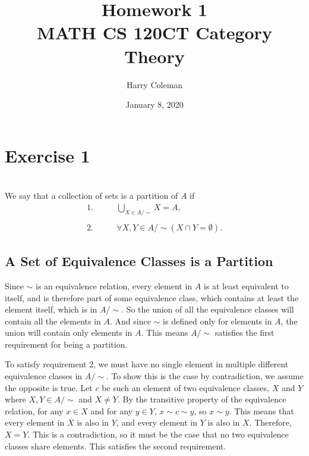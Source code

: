 \documentclass[12pt]{article}
\begin{document}
 
\title{Homework 1\\
    \large MATH CS 120CT Category Theory}
\author{Harry Coleman}
\date{January 8, 2020}

\maketitle

\section*{Exercise 1}
\\

We say that a collection of sets is a partition of $A$ if
\begin{align*}
    1. \qquad & \bigcup_{X\in A/{\sim}}X = A, \\\\
    2. \qquad & \forall X,Y \in A/{\sim} (X \cap Y = \emptyset).
\end{align*}

\subsection*{A Set of Equivalence Classes is a Partition}
Since $\sim$ is an equivalence relation, every element in $A$ is at least equivalent to itself, and is therefore part of some equivalence class, which contains at least the element itself, which is in $A/{\sim}$. So the union of all the equivalence classes will contain all the elements in $A$. And since $\sim$ is defined only for elements in $A$, the union will contain only elements in $A$. This means $A/{\sim}$ satisfies the first requirement for being a partition.

To satisfy requirement 2, we must have no single element in multiple different equivalence classes in $A/{\sim}$. To show this is the case by contradiction, we assume the opposite is true. Let $c$ be such an element of two equivalence classes, $X$ and $Y$ where $X,Y \in A/{\sim}$ and $X\ne Y$. By the transitive property of the equivalence relation, for any $x\in X$ and for any $y\in Y$, $x\sim c\sim y$, so $x\sim y$. This means that every element in $X$ is also in $Y$, and every element in $Y$ is also in $X$. Therefore, $X=Y$. This is a contradiction, so it must be the case that no two equivalence classes share elements. This satisfies the second requirement.
\end{document}

